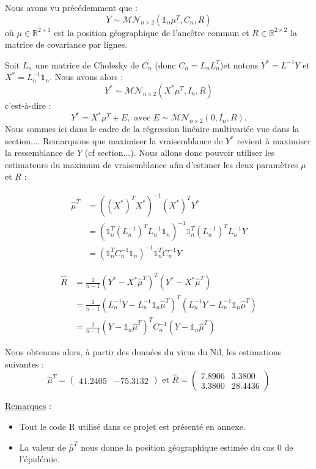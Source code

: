 \documentclass[a4paper,10pt]{article}
\newcommand{\bit}{\begin{itemize}}
\newcommand{\eit}{\end{itemize}}
\newcommand{\R}{\mathbb{R}}
\begin{document}
Nous avons vu précédemment que :
$$Y\sim \mathcal{MN}_{n\times 2}(\mathbb 1_n\mu^T,C_n,R)$$
où $\mu\in\R^{2\times 1}$ est la position géographique de l'ancêtre commun et $R\in\R^{2\times 2}$ la matrice de covariance par lignes. 



Soit $L_n$ une matrice de Cholesky de $C_n$ (donc $C_n=L_nL_n^T$)et notons $Y^*=L^{-1}Y$ et $X^*=L_n^{-1}\mathbb 1_n$. Nous avons alors :
$$Y^*\sim \mathcal{MN}_{n\times 2}(X^*\mu^T, I_n,R)$$
c'est-à-dire : 
$$Y^*=X^*\mu^T+E,\text{ avec } E\sim \mathcal{MN}_{n\times 2}(0, I_n,R).$$
Nous sommes ici dans le cadre de la régression linéaire multivariée vue dans {\red la section...}. Remarquons que maximiser la vraisemblance de $Y^*$ revient à maximiser la ressemblance de $Y$ ({\red cf section...}). Nous allons donc pouvoir utiliser les estimateurs du maximum de vraisemblance afin d'estimer les deux paramètres $\mu$ et $R$ :

$$\begin{array}{ll}
\widehat{\mu}^T&=((X^*)^TX^*)^{-1}(X^*)^TY^*\\
&= (\mathbb 1_n^T(L_n^{-1})^TL_n^{-1}\mathbb 1_n)^{-1}\mathbb 1_n^T(L_n^{-1})^TL_n^{-1}Y\\
&= (\mathbb 1_n^TC_n^{-1}\mathbb 1_n)^{-1}\mathbb 1_n^TC_n^{-1}Y
\end{array}$$

$$\begin{array}{ll}
\widehat{R}&=\frac 1{n-1}(Y^*-X^*\widehat\mu^T)^T(Y^*-X^*\widehat\mu^T)\\
&= \frac 1{n-1}(L_n^{-1}Y-L_n^{-1}\mathbb1_n\widehat\mu^T)^T(L_n^{-1}Y-L_n^{-1}\mathbb1_n\widehat\mu^T)\\
&= \frac 1{n-1}(Y-\mathbb1_n\widehat\mu^T)^TC_n^{-1}(Y-\mathbb1_n\widehat\mu^T)
\end{array}$$

Nous obtenons alors, à partir des données du virus du Nil, les estimations suivantes : 
$$\widehat\mu^T=\begin{pmatrix}
         41.2405 & -75.3132
        \end{pmatrix}
\text{ et }
\widehat R=\begin{pmatrix}
            7.8906 & 3.3800\\
            3.3800 & 28.4436
           \end{pmatrix}$$

\underline{Remarques} : 
\bit
\item Tout le code R utilisé dans ce projet est présenté en annexe. 
\item La valeur de $\widehat \mu^T$ nous donne la position géographique estimée du cas 0 de l'épidémie. 
\eit
\end{document}
